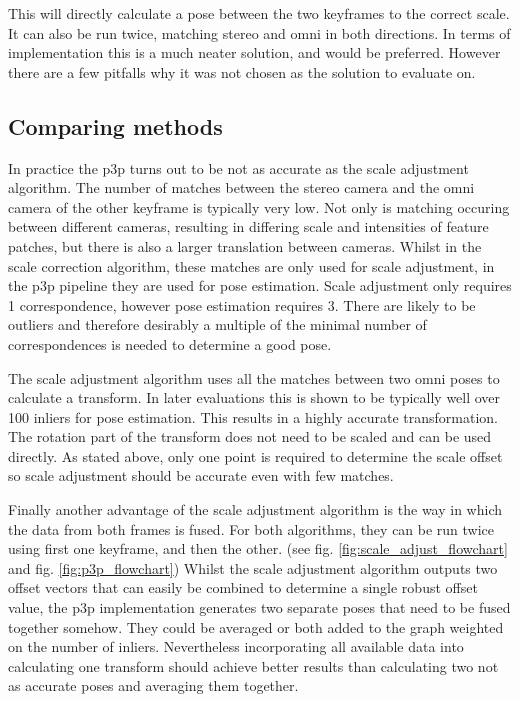 This will directly calculate a pose between the two keyframes to the correct scale.  It can also be run twice, matching stereo and omni in both directions. In terms of implementation this is a much neater solution, and would be preferred.  However there are a few pitfalls why it was not chosen as the solution to evaluate on.

\subsection{Comparing methods}

In practice the p3p turns out to be not as accurate as the scale adjustment algorithm.  The number of matches between the stereo camera and the omni camera of the other keyframe is typically very low.  Not only is matching occuring between different cameras, resulting in differing scale and intensities of feature patches, but there is also a larger translation between cameras. Whilst in the scale correction algorithm, these matches are only used for scale adjustment, in the p3p pipeline they are used for pose estimation.  Scale adjustment only requires 1 correspondence, however pose estimation requires 3.  There are likely to be outliers and therefore desirably a multiple of the minimal number of correspondences is needed to determine a good pose.

The scale adjustment algorithm uses all the matches between two omni poses to calculate a transform.  In later evaluations this is shown to be typically well over 100 inliers for pose estimation.  This results in a highly accurate transformation.  The rotation part of the transform does not need to be scaled and can be used directly.  As stated above, only one point is required to determine the scale offset so scale adjustment should be accurate even with few matches.

Finally another advantage of the scale adjustment algorithm is the way in which the data from both frames is fused.  For both algorithms, they can be run twice using first one keyframe, and then the other. (see fig. \ref{fig:scale_adjust_flowchart} and fig. \ref{fig:p3p_flowchart})  Whilst the scale adjustment algorithm outputs two offset vectors that can easily be combined to determine a single robust offset value, the p3p implementation generates two separate poses that need to be fused together somehow.  They could be averaged or both added to the graph weighted on the number of inliers. Nevertheless incorporating all available data into calculating one transform should achieve better results than calculating two not as accurate poses and averaging them together.

